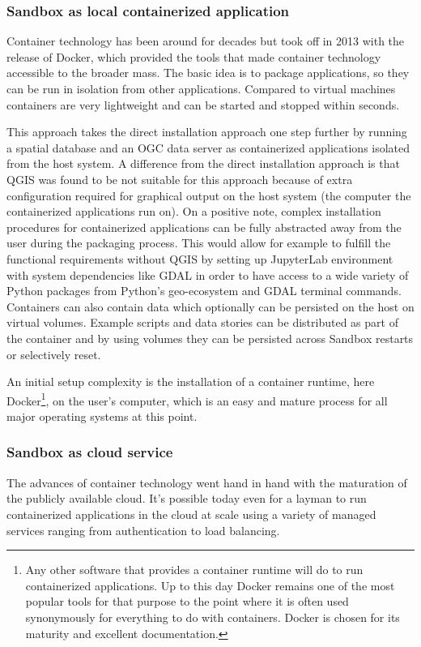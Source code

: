 \documentclass[11pt, a4paper, oneside, parskip=full-]{scrartcl}
\begin{document}
\subsubsection*{Sandbox as local containerized application}
Container technology has been around for decades but took off in 2013 with the
release of Docker, which provided the tools that made container technology
accessible to the broader mass. The basic idea is to package applications, so
they can be run in isolation from other applications. Compared to virtual
machines containers are very lightweight and can be started and stopped within
seconds.

This approach takes the direct installation approach one step further by running
a spatial database and an OGC data server as containerized applications isolated
from the host system. A difference from the direct installation approach is that
QGIS was found to be not suitable for this approach because of extra
configuration required for graphical output on the host system (the computer the
containerized applications run on). On a positive note, complex installation
procedures for containerized applications can be fully abstracted away from the
user during the packaging process. This would allow for example to fulfill the
functional requirements without QGIS by setting up JupyterLab environment with
system dependencies like GDAL in order to have access to a wide variety of
Python packages from Python's geo-ecosystem and GDAL terminal commands.
Containers can also contain data which optionally can be persisted on the host
on virtual volumes. Example scripts and data stories can be distributed as part
of the container and by using volumes they can be persisted across Sandbox
restarts or selectively reset.

An initial setup complexity is the installation of a container runtime, here
Docker\footnote{Any other software that provides a container runtime will do to
run containerized applications. Up to this day Docker remains one of the most
popular tools for that purpose to the point where it is often used synonymously
for everything to do with containers. Docker is chosen for its maturity and
excellent documentation.}, on the user's computer, which is an easy and mature
process for all major operating systems at this point.

\subsubsection*{Sandbox as cloud service}
The advances of container technology went hand in hand with the maturation of
the publicly available cloud. It's possible today even for a layman to run
containerized applications in the cloud at scale using a variety of managed
services ranging from authentication to load balancing.
\end{document}
